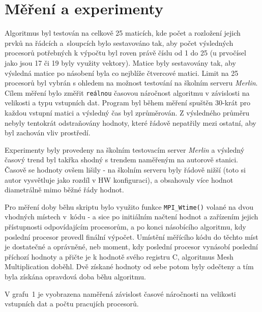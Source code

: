 \documentclass[a4paper,10pt]{article}
\begin{document}
	\section{Měření a experimenty}
	\label{sec:mereni}

		\par Algoritmus byl testován na celkově 25 maticích, kde počet a rozložení jejich prvků na řádcích a~sloupcích bylo sestavováno tak, aby počet výsledných procesorů potřebných k výpočtu byl roven právě číslu od 1 do 25 (u prvočísel jako jsou 17 či 19 byly využity vektory). Matice byly sestavovány tak, aby výsledná matice po násobení byla co nejblíže čtvercové matici. Limit na 25 procesorů byl vybrán s ohledem na možnost testování na školním serveru \textit{Merlin}. Cílem měření bylo změřit \texttt{reálnou} časovou náročnost algoritmu v závislosti na velikosti a typu vstupních dat. Program byl během měření spuštěn 30-krát pro každou vstupní matici a výsledný čas byl zprůměrován. Z výsledného průměru nebyly tentokrát odstraňovány hodnoty, které řádově nepatřily mezi ostatní, aby byl zachován vliv prostředí. 

		\par Experimenty byly provedeny na školním testovacím server \textit{Merlin} a výsledný časový trend byl takřka shodný s trendem naměřeným na autorově stanici. Časově se hodnoty ovšem lišily \-- na školním serveru byly řádově nižší (toto si autor vysvětluje jako rozdíl v HW konfiguraci), a obsahovaly více hodnot diametrálně mimo běžné řády hodnot.

		\par Pro měření doby běhu skriptu bylo využito funkce \texttt{MPI\_Wtime()} volané na dvou vhodných místech v~kódu \-- a sice po initiálním načtení hodnot a zařízením jejich přístupnosti odpovídajícím procesorům, a po konci násobícího algoritmu, kdy poslední procesor provedl finální výpočet. Umístění měřícího kódu do těchto míst je dostatečné a oprávněné, neb moment, kdy poslední procesor vynásobí poslední příchozí hodnoty a přičte je k hodnotě svého registru C, algoritmus Mesh Multiplication doběhl. Dvě získané hodnoty od sebe potom byly odečteny a tím byla získána opravdová doba běhu algoritmu. 
    	
    	\par V grafu~1 je vyobrazena naměřená závislost časové náročnosti na velikosti vstupních dat a počtu pracujích procesorů.  
\end{document}
